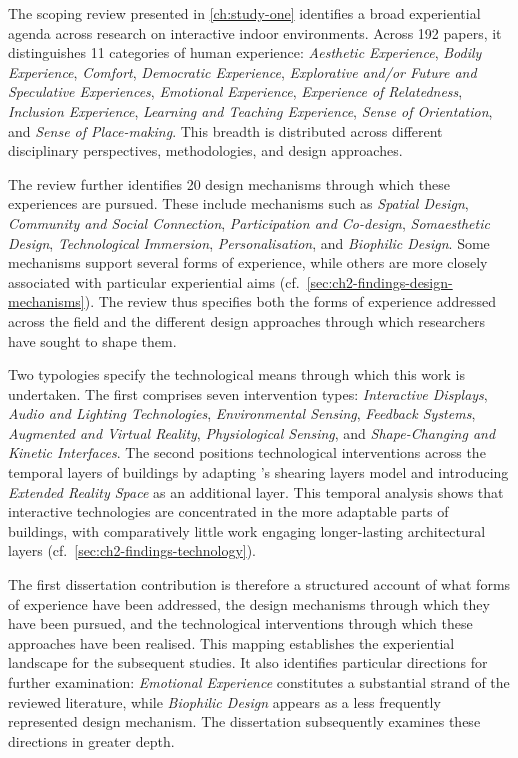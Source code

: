 The scoping review presented in \autoref{ch:study-one} identifies a broad
experiential agenda across research on interactive indoor environments.
Across 192 papers, it distinguishes 11 categories of human experience:
\textit{Aesthetic Experience}, \textit{Bodily Experience},
\textit{Comfort}, \textit{Democratic Experience}, \textit{Explorative
and/or Future and Speculative Experiences}, \textit{Emotional
Experience}, \textit{Experience of Relatedness}, \textit{Inclusion
Experience}, \textit{Learning and Teaching Experience}, \textit{Sense
of Orientation}, and \textit{Sense of Place-making}. This breadth is
distributed across different disciplinary perspectives, methodologies,
and design approaches.

The review further identifies 20 design mechanisms through which these
experiences are pursued. These include mechanisms such as
\textit{Spatial Design}, \textit{Community and Social Connection},
\textit{Participation and Co-design}, \textit{Somaesthetic Design},
\textit{Technological Immersion}, \textit{Personalisation}, and
\textit{Biophilic Design}. Some mechanisms support several forms of
experience, while others are more closely associated with particular
experiential aims
(cf.~\autoref{sec:ch2-findings-design-mechanisms}). The review thus
specifies both the forms of experience addressed across the field and
the different design approaches through which researchers have sought
to shape them.

Two typologies specify the technological means through which this work is undertaken. The first comprises seven intervention types: \textit{Interactive Displays}, \textit{Audio and Lighting Technologies}, \textit{Environmental Sensing}, \textit{Feedback Systems}, \textit{Augmented and Virtual Reality}, \textit{Physiological Sensing}, and \textit{Shape-Changing and Kinetic Interfaces}. The second positions technological interventions across the temporal layers of buildings by adapting \citet{brand1995buildings}'s shearing layers model and introducing \textit{Extended Reality Space} as an additional
layer. This temporal analysis shows that interactive technologies are
concentrated in the more adaptable parts of buildings, with comparatively little work engaging longer-lasting architectural layers (cf.~\autoref{sec:ch2-findings-technology}).

The first dissertation contribution is therefore a structured account of what forms of experience have been addressed, the design mechanisms through which
they have been pursued, and the technological interventions through
which these approaches have been realised. This mapping establishes the experiential landscape for the subsequent studies. It also identifies particular directions for further examination: \textit{Emotional Experience} constitutes a substantial strand of the reviewed literature, while \textit{Biophilic Design} appears as a less frequently represented design mechanism. The dissertation subsequently examines these directions in greater depth.

